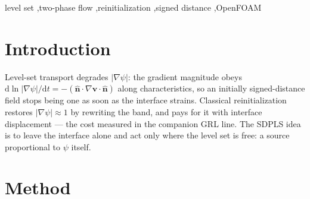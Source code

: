 \documentclass[preprint,3p,11pt]{elsarticle}
\newcommand{\psilev}{\psi}
\newcommand{\nhat}{\hat{\mathbf{n}}}
\newcommand{\gradpsi}{\lvert\nabla\psilev\rvert}
\begin{document}
\begin{frontmatter}
\begin{abstract}
requiring the exact one-step factor to be applied \emph{implicitly},
$S_p = (1-e^{-z})/\Delta t$ with $S_c = 0$, recovers in full the shape and volume
order that the explicit exponential delivery gives up, while keeping unconditional
sign preservation and removing the $|f_{nl}|\Delta t < 1$ diagonal restriction by
construction. Two coupled-patch defects --- a face-centre velocity written into
coupled patches, and the raw flux written over processor faces --- have been fixed;
they are parallel-only, and every parallel kinematic result carrying an SDPLS
source predates them and is pending re-measurement.
\end{abstract}

\begin{keyword}
level set \sep two-phase flow \sep reinitialization \sep signed distance
\sep OpenFOAM
\end{keyword}
\end{frontmatter}

\section{Introduction}
Level-set transport degrades $\gradpsi$: the gradient magnitude obeys
$\mathrm d\ln\gradpsi/\mathrm dt = -(\nhat\cdot\nabla\mathbf{v}\cdot\nhat)$
along characteristics, so an initially signed-distance field stops being one as
soon as the interface strains. Classical reinitialization
\cite{sussman1994,russo2000} restores $\gradpsi\approx1$ by rewriting the band,
and pays for it with interface displacement --- the cost measured in the
companion GRL line. The SDPLS idea is to leave the interface alone and act
only where the level set is free: a source proportional to $\psilev$ itself.

\section{Method}
\end{document}
